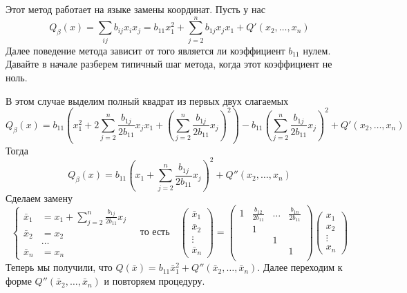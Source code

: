 Этот метод работает на языке замены координат.
Пусть у нас
\[
Q_\beta(x) = \sum_{ij}b_{ij}x_i x_j = b_{11}x_1^2 + \sum_{j=2}^n b_{1j}x_j x_1 + Q'(x_2,\ldots,x_n)
\]
Далее поведение метода зависит от того является ли коэффициент $b_{11}$ нулем.
Давайте в начале разберем типичный шаг метода, когда этот коэффициент не ноль.

В этом случае выделим полный квадрат из первых двух слагаемых
\[
Q_\beta(x) = b_{11}\left(x_1^2 + 2 \sum_{j=2}^n \frac{b_{1j}}{2 b_{11}}x_j x_1 + \left(\sum_{j=2}^n \frac{b_{1j}}{2 b_{11}}x_j \right)^2\right) - b_{11}\left(\sum_{j=2}^n \frac{b_{1j}}{2 b_{11}}x_j\right)^2 + Q'(x_2,\ldots,x_n)
\]
Тогда
\[
Q_\beta(x) = b_{11}\left(x_1 + \sum_{j=2}^n \frac{b_{1j}}{2 b_{11}}x_j \right)^2 + Q''(x_2,\ldots,x_n)
\]
Сделаем замену
\[
\left\{
\begin{aligned}
\bar x_1 &= x_1 + \sum_{j=2}^n \frac{b_{1j}}{2 b_{11}}x_j \\
\bar x_2 &= x_2\\
&\ldots\\
\bar x_n &= x_n
\end{aligned}
\right.
\quad\text{то есть}\quad
\begin{pmatrix}
{\bar x_1}\\{\bar x_2}\\{\vdots}\\{\bar x_n}
\end{pmatrix}
=
\begin{pmatrix}
{1}&{\frac{b_{12}}{2b_{11}}}&{\ldots}&{\frac{b_{1n}}{2b_{11}}}\\
{}&{1}&{}&{}\\
{}&{}&{1}&{}\\
{}&{}&{}&{1}\\
\end{pmatrix}
\begin{pmatrix}
{x_1}\\{x_2}\\{\vdots}\\{x_n}
\end{pmatrix}
\]
Теперь мы получили, что $Q(\bar x) = b_{11}\bar x_1^2 + Q''(\bar x_2,\ldots, \bar x_n)$.
Далее переходим к форме $Q''(\bar x_2,\ldots, \bar x_n)$ и повторяем процедуру.


